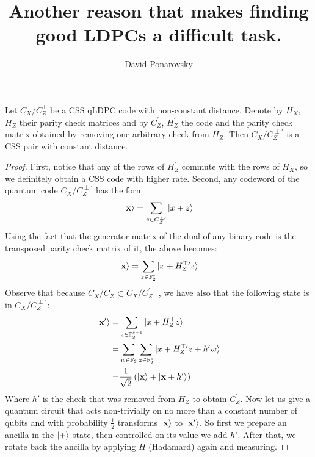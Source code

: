 \documentclass[manuscript,screen,review]{acmart}
\begin{document}


\title{Another reason that makes finding good LDPCs a difficult task.} 
\author{David Ponarovsky}
  \maketitle
  
  \begin{claim}
Let $C_X/C_Z^{\perp}$ be a CSS qLDPC code with non-constant distance. Denote by $H_X$, $H_Z$ their parity check matrices and by $C_Z^{\prime}$, $H_Z^{\prime}$ the code and the parity check matrix obtained by removing one arbitrary check from $H_Z$. Then $C_X/C_Z^{\perp \prime}$ is a CSS pair with constant distance.
\end{claim}

\begin{proof}
First, notice that any of the rows of $H_Z^{\prime}$ commute with the rows of $H_X$, so we definitely obtain a CSS code with higher rate. Second, any codeword of the quantum code $C_X/C_Z^{\perp \prime}$ has the form  
\begin{equation*}
  \begin{split}
    \ket{\mathbf{x}} = \sum_{z \in C_Z^{\perp \prime}}{\ket{x + z}}
  \end{split}
\end{equation*}
Using the fact that the generator matrix of the dual of any binary code is the transposed parity check matrix of it, the above becomes:
\begin{equation*}
  \begin{split}
    \ket{\mathbf{x}} = \sum_{z \in \mathbb{F}_2^s}{\ket{x + H_Z^{\top \prime}z}}
  \end{split}
\end{equation*}
Observe that because $C_X/C_Z^{\perp} \subset C_X/C_Z^{\prime \perp}$, we have also that the following state is in $C_X/C_Z^{\perp \prime}$:
\begin{equation*}
  \begin{split} 
    \ket{\mathbf{x'}} = & \sum_{z \in \mathbb{F}_2^{s+1}}{\ket{x + H_Z^{\top}z}} \\
    =& \sum_{w \in \mathbb{F}_2}\sum_{z \in \mathbb{F}_2^s}{\ket{x + H_Z^{\top \prime}z + h'w  }} \\ 
    =& \frac{1}{\sqrt{2}}\left( \ket{\mathbf{x}} + \ket{\mathbf{x} + h^{\prime}} \right)
  \end{split}
\end{equation*}
Where $h'$ is the check that was removed from $H_Z$ to obtain $C_Z^{\prime}$. Now let us give a quantum circuit that acts non-trivially on no more than a constant number of qubits and with probability $\frac{1}{2}$ transforms $\ket{\mathbf{x}}$ to $\ket{\mathbf{x'}}$. So first we prepare an ancilla in the $\ket{+}$ state, then controlled on its value we add $h'$. After that, we rotate back the ancilla by applying $H$ (Hadamard) again and measuring.


\end{proof}
\end{document}
